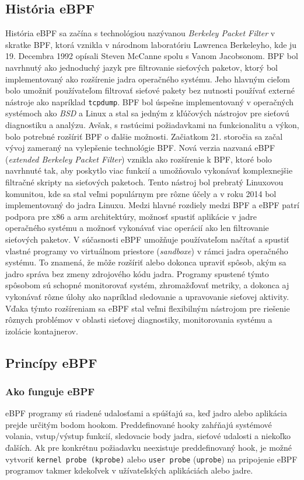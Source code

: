 \subsection{História eBPF}
História eBPF sa začína s technológiou nazývanou \emph{Berkeley Packet Filter} v skratke BPF, ktorá vznikla v národnom laboratóriu Lawrenca Berkeleyho, 
kde ju 19. Decembra 1992 opísali Steven McCanne spolu s Vanom Jacobsonom. BPF bol navrhnutý ako jednoduchý jazyk pre filtrovanie sieťových paketov, 
ktorý bol implementovaný ako rozšírenie jadra operačného systému. Jeho hlavným cieľom bolo umožniť používateľom filtrovať sieťové pakety bez nutnosti 
používať externé nástroje ako napríklad \texttt{tcpdump}. BPF bol úspešne implementovaný v operačných systémoch ako \emph{BSD} a Linux a stal sa jedným z 
kľúčových nástrojov pre sieťovú diagnostiku a analýzu. Avšak, s rastúcimi požiadavkami na funkcionalitu a výkon, bolo potrebné rozšíriť BPF o ďalšie možnosti. 
Začiatkom 21. storočia sa začal vývoj zameraný na vylepšenie technológie BPF. Nová verzia nazvaná eBPF (\emph{extended Berkeley Packet Filter}) vznikla ako 
rozšírenie k BPF, ktoré bolo navrhnuté tak, aby poskytlo viac funkcií a umožňovalo vykonávať komplexnejšie filtračné skripty na sieťových paketoch. 
Tento nástroj bol prebratý Linuxovou komunitou, kde sa stal veľmi populárnym pre rôzne účely a v roku 2014 bol implementovaný do jadra Linuxu. 
Medzi hlavné rozdiely medzi BPF a eBPF patrí podpora pre x86 a arm architektúry, možnosť spustiť aplikácie v jadre operačného systému a možnosť 
vykonávať viac operácií ako len filtrovanie sieťových paketov. V súčasnosti eBPF umožňuje používateľom načítať a spustiť vlastné programy vo 
virtuálnom priestore (\emph{sandboxe}) v rámci jadra operačného systému. To znamená, že môže rozšíriť alebo dokonca upraviť spôsob, akým sa jadro správa 
bez zmeny zdrojového kódu jadra. Programy spustené týmto spôsobom sú schopné monitorovať systém, zhromažďovať metriky, a dokonca aj vykonávať 
rôzne úlohy ako napríklad sledovanie a upravovanie sieťovej aktivity. Vďaka týmto rozšíreniam sa eBPF stal veľmi flexibilným nástrojom pre 
riešenie rôznych problémov v oblasti sieťovej diagnostiky, monitorovania systému a izolácie kontajnerov.~\cite{eBPF, history, wiki} 

\subsection{Princípy eBPF}
\subsubsection{Ako funguje eBPF} 
eBPF programy sú riadené udalosťami a spúšťajú sa, keď jadro alebo aplikácia prejde určitým bodom hookom. Preddefinované hooky zahŕňajú systémové volania, vstup/výstup funkcií, sledovacie body jadra, sieťové udalosti a niekoľko ďalších.
Ak pre konkrétnu požiadavku neexistuje preddefinovaný hook, je možné vytvoriť \texttt{kernel probe (\texttt{kprobe})} alebo \texttt{user probe} (\texttt{uprobe}) na pripojenie eBPF programov takmer kdekoľvek v užívateľských aplikáciách alebo jadre.

